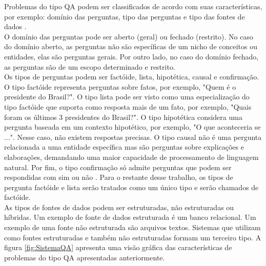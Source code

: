 \documentclass{article}
\begin{document}
Problemas do tipo QA podem ser classificados de acordo com suas características, por exemplo: domínio das perguntas, tipo das perguntas e tipo das fontes de dados \citep{mishra2016survey, speech}.\\

O domínio das perguntas pode ser aberto (geral) ou fechado (restrito). No caso do domínio aberto, as perguntas não são específicas de um nicho de conceitos ou entidades, elas são perguntas gerais. Por outro lado, no caso do domínio fechado, as perguntas são de um escopo determinado e restrito.\\

Os tipos de perguntas podem ser factóide, lista, hipotética, causal e confirmação. O tipo factóide representa perguntas sobre fatos, por exemplo, "Quem é o presidente do Brasil?". O tipo lista pode ser visto como uma especialização do tipo factóide que suporta como resposta mais de um fato, por exemplo, "Quais foram os últimos 3 presidentes do Brasil?". O tipo hipotética considera uma pergunta baseada em um contexto hipotético, por exemplo, "O que aconteceria se ...". Nesse caso, não existem respostas precisas. O tipo causal não é uma pergunta relacionada a uma entidade específica mas são perguntas sobre explicações e elaborações, demandando uma maior capacidade de processamento de linguagem natural. Por fim, o tipo confirmação só admite perguntas que podem ser respondidas com sim ou não \citep{mishra2016survey}. Para o restante desse trabalho, os tipos de pergunta factóide e lista serão tratados como um único tipo e serão chamados de factóide.\\

As tipos de fontes de dados podem ser estruturadas, não estruturadas ou híbridas. Um exemplo de fonte de dados estruturada é um banco relacional. Um exemplo de uma fonte não estruturada são arquivos textos. Sistemas que utilizam como fontes estruturadas e também não estruturadas formam um terceiro tipo. A figura \ref{fig:SistemaQA} apresenta uma visão gráfica das características de problemas do tipo QA apresentadas anteriormente.\\
\end{document}
